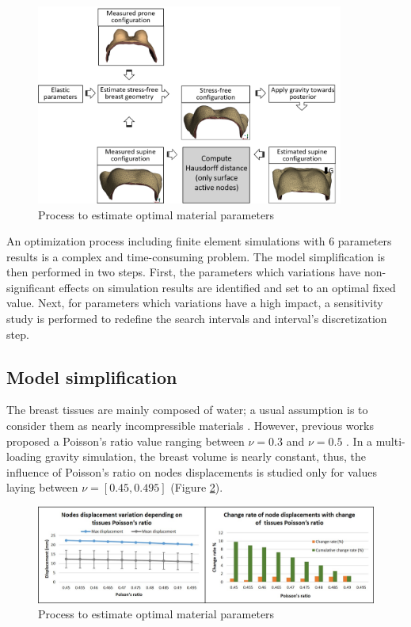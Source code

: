 \begin{figure}[!h]
\centering
\includegraphics[width=0.9\textwidth,keepaspectratio]{figures/optimizationMaterialParameters.png} 
\caption{Process to estimate optimal material parameters}\label{fig:optimizationalgo}
\end{figure}
 
 An optimization process including finite element simulations with 6 parameters results is a complex and time-consuming problem. The model simplification is then performed in two steps. First, the parameters which variations have non-significant effects on simulation results are identified and set to an optimal fixed value. Next, for parameters which variations have a high impact, a sensitivity study is performed to redefine the search intervals and interval's discretization step.
 
 \subsection{Model simplification}

The breast tissues are mainly composed of water; a usual assumption is to consider them as nearly incompressible materials \citep{fung_biomechanics_2013}. However,
previous works proposed a Poisson's ratio value ranging between $\nu = 0.3$ \citep{hopp_automatic_2013} and $\nu = 0.5$ \citep{gamage_modelling_2012}. In a multi-loading gravity simulation, the breast volume is nearly constant, thus, the influence of Poisson's ratio on nodes displacements is studied only for values laying between $\nu = [0.45 , 0.495]$ (Figure \ref{fig:poissonRatio}). 

\begin{figure}[!h]
\centering
\includegraphics[width=\textwidth,keepaspectratio]{figures/poissonRatio.jpg} 
\caption{Process to estimate optimal material parameters}\label{fig:poissonRatio}
\end{figure}

